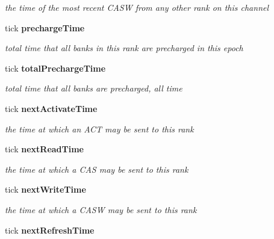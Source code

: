 \begin{DoxyCompactItemize}
\begin{DoxyCompactList}\small\item\em the time of the most recent CASW from any other rank on this channel \item\end{DoxyCompactList}\item 
tick {\bf prechargeTime}\label{class_d_r_a_msim_i_i_1_1_rank_aeb77e015a3b99f650532de70c07b2d93}

\begin{DoxyCompactList}\small\item\em total time that all banks in this rank are precharged in this epoch \item\end{DoxyCompactList}\item 
tick {\bf totalPrechargeTime}\label{class_d_r_a_msim_i_i_1_1_rank_aab3ff3515ed5cfef8ed24f76ac3ea274}

\begin{DoxyCompactList}\small\item\em total time that all banks are precharged, all time \item\end{DoxyCompactList}\item 
tick {\bf nextActivateTime}\label{class_d_r_a_msim_i_i_1_1_rank_a59ed61cd8b6c9e274497c437adecac49}

\begin{DoxyCompactList}\small\item\em the time at which an ACT may be sent to this rank \item\end{DoxyCompactList}\item 
tick {\bf nextReadTime}\label{class_d_r_a_msim_i_i_1_1_rank_ab8293011ad2fd602dd30e43f7cca510e}

\begin{DoxyCompactList}\small\item\em the time at which a CAS may be sent to this rank \item\end{DoxyCompactList}\item 
tick {\bf nextWriteTime}\label{class_d_r_a_msim_i_i_1_1_rank_a56124c95faffa161c4e37f6db65f943c}

\begin{DoxyCompactList}\small\item\em the time at which a CASW may be sent to this rank \item\end{DoxyCompactList}\item 
tick {\bf nextRefreshTime}\label{class_d_r_a_msim_i_i_1_1_rank_a3a9afe5766794463fd312f978d207bcb}


\end{DoxyCompactItemize}
